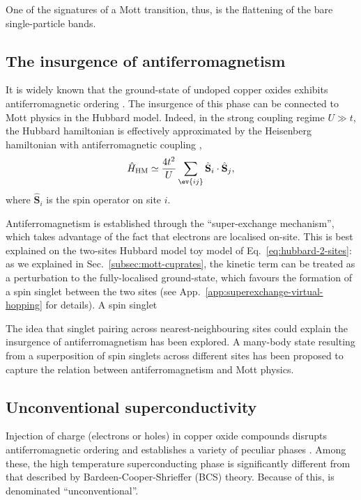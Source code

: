 One of the signatures of a Mott transition, thus, is the flattening of the bare single-particle bands.

\subsection{The insurgence of antiferromagnetism}\label{subsec:af-cuprates}

It is widely known that the ground-state of undoped copper oxides exhibits antiferromagnetic ordering \cite{hirsch1985twodimensional, scalapino2012common, keimer2015quantum}. The insurgence of this phase can be connected to Mott physics in the Hubbard model. Indeed, in the strong coupling regime $U \gg t$, the Hubbard hamiltonian is effectively approximated by the Heisenberg hamiltonian with antiferromagnetic coupling \cite{marston1989large},
\[
	\hat H_\mathrm{HM} \simeq \frac{4t^2}{U} \sum_{\ev{ij}} \hat{\mathbf{S}}_i \cdot \hat{\mathbf{S}}_j,
\]
where $\hat{\mathbf{S}}_i$ is the spin operator on site $i$. 

Antiferromagnetism is established through the ``super-exchange mechanism'', which takes advantage of the fact that electrons are localised on-site. This is best explained on the two-sites Hubbard model toy model of Eq.~\eqref{eq:hubbard-2-sites}: as we explained in Sec.~\ref{subsec:mott-cuprates}, the kinetic term can be treated as a perturbation to the fully-localised ground-state, which favours the formation of a spin singlet between the two sites (see App.~\ref{app:superexchange-virtual-hopping} for details). A spin singlet 

The idea that singlet pairing across nearest-neighbouring sites could explain the insurgence of antiferromagnetism has been explored. A many-body state resulting from a superposition of spin singlets across different sites has been proposed \cite{anderson1973resonating,fazekas1974ground} to capture the relation between antiferromagnetism and Mott physics.

\subsection{Unconventional superconductivity}\label{subsec:sc-cuprates}

Injection of charge (electrons or holes) in copper oxide compounds disrupts antiferromagnetic ordering and establishes a variety of peculiar phases \cite{keimer2015quantum}. Among these, the high temperature superconducting phase is significantly different from that described by Bardeen-Cooper-Shrieffer (BCS) theory. Because of this, is denominated ``unconventional''.

